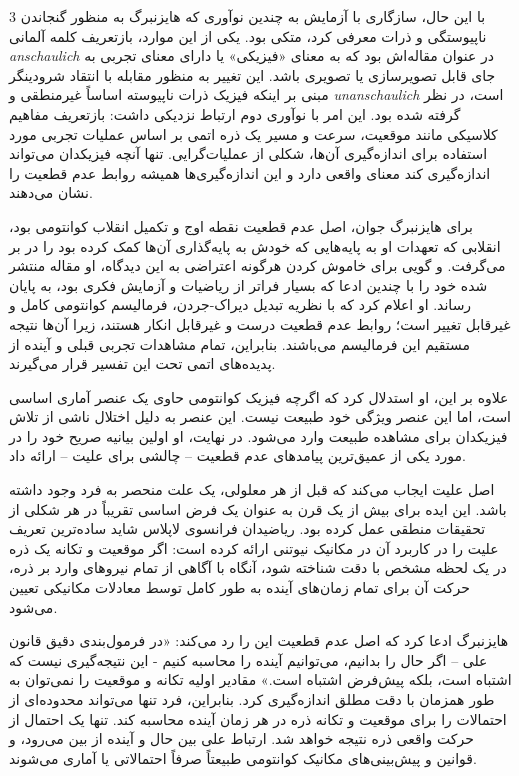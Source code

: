 \documentclass[11pt,a4paper]{article}
\begin{document}
\begin{multicols}{3}
با این حال، سازگاری با آزمایش به چندین نوآوری که هایزنبرگ به منظور گنجاندن ناپیوستگی و ذرات معرفی کرد، متکی بود. یکی از این موارد، بازتعریف کلمه آلمانی \textit{anschaulich} در عنوان مقاله‌اش بود که به معنای «فیزیکی» یا دارای معنای تجربی به جای قابل تصویرسازی یا تصویری باشد. این تغییر به منظور مقابله با انتقاد شرودینگر مبنی بر اینکه فیزیک ذرات ناپیوسته اساساً غیرمنطقی و \textit{unanschaulich} است، در نظر گرفته شده بود. این امر با نوآوری دوم ارتباط نزدیکی داشت: بازتعریف مفاهیم کلاسیکی مانند موقعیت، سرعت و مسیر یک ذره اتمی بر اساس عملیات تجربی مورد استفاده برای اندازه‌گیری آن‌ها، شکلی از عملیات‌گرایی. تنها آنچه فیزیکدان می‌تواند اندازه‌گیری کند معنای واقعی دارد و این اندازه‌گیری‌ها همیشه روابط عدم قطعیت را نشان می‌دهند.

برای هایزنبرگ جوان، اصل عدم قطعیت نقطه اوج و تکمیل انقلاب کوانتومی بود، انقلابی که تعهدات او به پایه‌هایی که خودش به پایه‌گذاری آن‌ها کمک کرده بود را در بر می‌گرفت. و گویی برای خاموش کردن هرگونه اعتراضی به این دیدگاه، او مقاله منتشر شده خود را با چندین ادعا که بسیار فراتر از ریاضیات و آزمایش فکری بود، به پایان رساند. او اعلام کرد که با نظریه تبدیل دیراک-جردن، فرمالیسم کوانتومی کامل و غیرقابل تغییر است؛ روابط عدم قطعیت درست و غیرقابل انکار هستند، زیرا آن‌ها نتیجه مستقیم این فرمالیسم می‌باشند. بنابراین، تمام مشاهدات تجربی قبلی و آینده از پدیده‌های اتمی تحت این تفسیر قرار می‌گیرند.

علاوه بر این، او استدلال کرد که اگرچه فیزیک کوانتومی حاوی یک عنصر آماری اساسی است، اما این عنصر ویژگی خود طبیعت نیست. این عنصر به دلیل اختلال ناشی از تلاش فیزیکدان برای مشاهده طبیعت وارد می‌شود. در نهایت، او اولین بیانیه صریح خود را در مورد یکی از عمیق‌ترین پیامدهای عدم قطعیت -- چالشی برای علیت -- ارائه داد.

اصل علیت ایجاب می‌کند که قبل از هر معلولی، یک علت منحصر به فرد وجود داشته باشد. این ایده برای بیش از یک قرن به عنوان یک فرض اساسی تقریباً در هر شکلی از تحقیقات منطقی عمل کرده بود. ریاضیدان فرانسوی لاپلاس شاید ساده‌ترین تعریف علیت را در کاربرد آن در مکانیک نیوتنی ارائه کرده است: اگر موقعیت و تکانه یک ذره در یک لحظه مشخص با دقت شناخته شود، آنگاه با آگاهی از تمام نیروهای وارد بر ذره، حرکت آن برای تمام زمان‌های آینده به طور کامل توسط معادلات مکانیکی تعیین می‌شود.

هایزنبرگ ادعا کرد که اصل عدم قطعیت این را رد می‌کند: «در فرمول‌بندی دقیق قانون علی -- اگر حال را بدانیم، می‌توانیم آینده را محاسبه کنیم - این نتیجه‌گیری نیست که اشتباه است، بلکه پیش‌فرض اشتباه است.» مقادیر اولیه تکانه و موقعیت را نمی‌توان به طور همزمان با دقت مطلق اندازه‌گیری کرد. بنابراین، فرد تنها می‌تواند محدوده‌ای از احتمالات را برای موقعیت و تکانه ذره در هر زمان آینده محاسبه کند. تنها یک احتمال از حرکت واقعی ذره نتیجه خواهد شد. ارتباط علی بین حال و آینده از بین می‌رود، و قوانین و پیش‌بینی‌های مکانیک کوانتومی طبیعتاً صرفاً احتمالاتی یا آماری می‌شوند.


\end{multicols}
\end{document}

